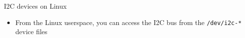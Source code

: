 \begin{frame}
   {I2C devices on Linux}
   \begin{itemize}
      \item From the Linux userspace, you can access the I2C bus
	      from the \verb?/dev/i2c-*? device files
   \end{itemize}
\end{frame}

\cprotect\note{

}

